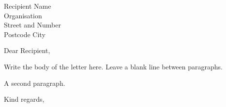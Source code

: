 \documentclass[11pt]{letter}
\date{\today}
\begin{document}
\begin{letter}{Recipient Name\\Organisation\\Street and Number\\Postcode City}

\opening{Dear Recipient,}

Write the body of the letter here. Leave a blank line between paragraphs.

A second paragraph.

\closing{Kind regards,}

\end{letter}
\end{document}
